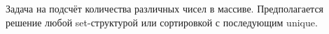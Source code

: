 Задача на подсчёт количества различных чисел в массиве.
Предполагается решение любой set-структурой или сортировкой
с последующим unique.
